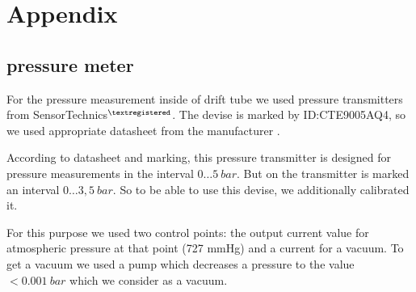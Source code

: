 \documentclass[12pt,a4paper]{article}
\begin{document}
	
	
	
	    
		
	
	
	
	
\newpage
\section{Appendix}

\subsection{pressure meter}

	For the pressure measurement inside of drift tube we used pressure transmitters from SensorTechnics$^{\textregistered}$. The devise is marked by ID:CTE9005AQ4, so we used appropriate datasheet  from the manufacturer \cite{presTransmitDatasheet}.
	
	According to datasheet and marking, this pressure transmitter is designed for pressure measurements in the interval $0 \dots 5~bar$. But on the transmitter is marked an interval $0\dots 3,5~bar$. So to be able to use this devise, we additionally calibrated it.
	
	For this purpose we used two control points: the output current value for atmospheric pressure at that point (727 mmHg) and a current for a vacuum. To get a vacuum we used a pump which decreases a pressure to the value  $<0.001~bar$ which we consider as a vacuum.
	
\end{document}
